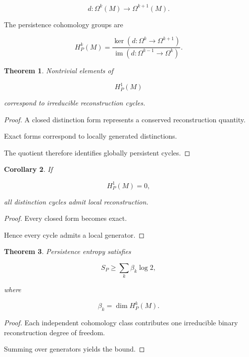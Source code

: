 \documentclass[12pt,oneside]{article}
\newtheorem{theorem}{Theorem}[section] \newtheorem{lemma}[theorem]{Lemma} \newtheorem{proposition}[theorem]{Proposition} \newtheorem{corollary}[theorem]{Corollary}
\theoremstyle{definition}
\begin{document}
\[
d:
\Omega^k(M)
\to
\Omega^{k+1}(M).
\]

The persistence cohomology groups are

\[
H_P^k(M)
=
\frac{
\ker(d:\Omega^k\to\Omega^{k+1})
}{
\operatorname{im}(d:\Omega^{k-1}\to\Omega^k)
}.
\]

\begin{theorem}

Nontrivial elements of

\[
H_P^1(M)
\]

correspond to irreducible reconstruction cycles.

\end{theorem}

\begin{proof}

A closed distinction form represents a conserved reconstruction quantity.

Exact forms correspond to locally generated distinctions.

The quotient therefore identifies globally persistent cycles.

\end{proof}

\begin{corollary}

If

\[
H_P^1(M)=0,
\]

all distinction cycles admit local reconstruction.

\end{corollary}

\begin{proof}

Every closed form becomes exact.

Hence every cycle admits a local generator.

\end{proof}

\begin{theorem}

Persistence entropy satisfies

\[
S_P
\ge
\sum_k
\beta_k
\log 2,
\]

where

\[
\beta_k
=
\dim H_P^k(M).
\]

\end{theorem}

\begin{proof}

Each independent cohomology class contributes one irreducible binary reconstruction degree of freedom.

Summing over generators yields the bound.

\end{proof}
\end{document}
